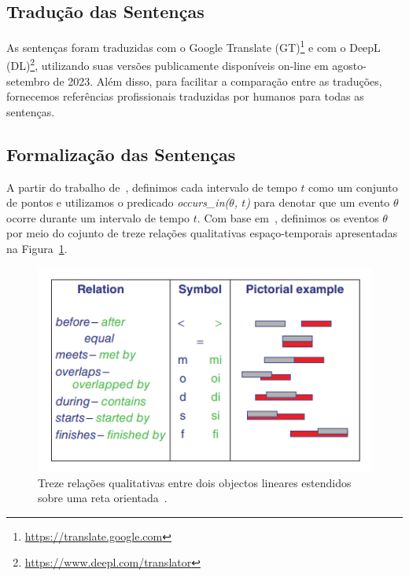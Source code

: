 \documentclass[a4paper, twocolumn, 11pt, twoside]{article}
\begin{document}
\subsection{Tradução das Sentenças}

As sentenças foram traduzidas com o Google Translate (GT)\footnote{\url{https://translate.google.com}} e 
com o DeepL (DL)\footnote{\url{https://www.deepl.com/translator}}, utilizando suas versões publicamente 
disponíveis on-line em agosto-setembro de 2023. Além disso, para facilitar a comparação entre as traduções, fornecemos 
referências profissionais traduzidas por humanos para todas as sentenças.


\subsection{Formalização das Sentenças}

A partir do trabalho de~\citet{spranger2016robust}, definimos cada intervalo de tempo $t$ como um conjunto de pontos e utilizamos o predicado \textit{occurs\_in($\theta$, $t$)} para denotar que um evento $\theta$ ocorre durante um intervalo de tempo $t$.
Com base em~\citet{freksa2016neighborhood}, definimos os eventos $\theta$ por meio do cojunto de treze relações qualitativas espaço-temporais apresentadas na Figura~\ref{fig:13_relations}.

\begin{figure}[ht]
	\centering
	\includegraphics[width=\columnwidth]{Figures/13_concep_neigb_relat.png}
	\caption{Treze relações qualitativas entre dois objectos lineares estendidos sobre uma reta orientada~\citep{freksa2016neighborhood}.}
	\label{fig:13_relations}
\end{figure}
\end{document}
